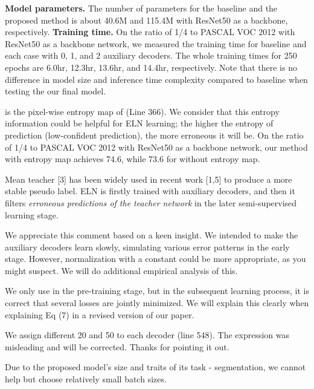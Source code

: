 \documentclass[10pt,twocolumn,letterpaper]{article}
\begin{document}
 \textbf{Model parameters.}
The number of parameters for the baseline and the proposed method is about 40.6M and 115.4M with ResNet50 as a backbone, respectively. 
\textbf{Training time.} On the ratio of 1/4 to PASCAL VOC 2012 with ResNet50 as a backbone network, we measured the training time for baseline and each case with 0, 1, and 2 auxiliary decoders. The whole training times for 250 epochs are 6.0hr, 12.3hr, 13.6hr, and 14.4hr, respectively. Note that there is no difference in model size and inference time complexity compared to baseline when testing the our final model.

  is the pixel-wise entropy map of (Line 366). We consider that this entropy information could be helpful for ELN learning; the higher the entropy of prediction (low-confident prediction), the more erroneous it will be. On the ratio of 1/4 to PASCAL VOC 2012 with ResNet50 as a backbone network, our method with entropy map achieves 74.6, while 73.6 for without entropy map.

Mean teacher [3] has been widely used in recent work [1,5] to produce a more stable pseudo label. ELN is firstly trained with auxiliary decoders, and then it filters \textit{erroneous predictions of the teacher network} in the later semi-supervised learning stage.

We appreciate this comment based on a keen insight. We intended to make the auxiliary decoders learn slowly, simulating various error patterns in the early stage. However, normalization with a constant could be more appropriate, as you might suspect. We will do additional empirical analysis of this.

 We only use  in the pre-training stage, but in the subsequent learning process, it is correct that several losses are jointly minimized. We will explain this clearly when explaining Eq (7) in a revised version of our paper.

 We assign different 20 and 50 to each decoder (line 548). The expression was misleading and will be corrected. Thanks for pointing it out.

 Due to the proposed model's size and traits of its task - segmentation, we cannot help but choose relatively small batch sizes. 
\end{document}
